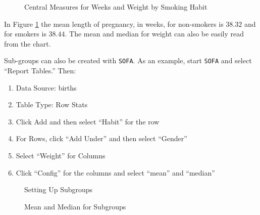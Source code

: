 \begin{figure}[H]
  \begin{center}
    \caption{Central Measures for Weeks and Weight by Smoking Habit}
    \label{cen:img06}
  \end{center}
\end{figure}

In Figure \ref{cen:img06} the mean length of pregnancy, in weeks, for non-smokers is $ 38.32 $ and for smokers is $ 38.44 $. The mean and median for weight can also be easily read from the chart.

Sub-groups can also be created with \texttt{SOFA}. As an example, start \texttt{SOFA} and select ``Report Tables.'' Then:

\begin{enumerate}
  \item Data Source: births
  \item Table Type: Row Stats
  \item Click Add and then select ``Habit'' for the row
  \item For Rows, click ``Add Under'' and then select ``Gender'' 
  \item Select ``Weight'' for Columns
  \item Click ``Config'' for the columns and select ``mean'' and ``median''
\end{enumerate}

\begin{figure}[H]
  \begin{center}
    \caption{Setting Up Subgroups}
  \end{center}
\end{figure}

\begin{figure}[H]
  \begin{center}
    \caption{Mean and Median for Subgroups}
    \label{cen:img08}
  \end{center}
\end{figure}

